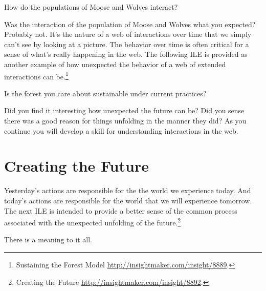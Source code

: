 \documentclass[]{memoir}
\begin{document}
\FloatBarrier 

\begin{model}[frametitle={Model: Moose and Wolves}] 

 How do the populations of Moose and Wolves interact?




 \end{model}

Was the interaction of the population of Moose and Wolves what you
expected? Probably not. It's the nature of a web of interactions over
time that we simply can't see by looking at a picture. The behavior over
time is often critical for a sense of what's really happening in the
web. The following ILE is provided as another example of how unexpected
the behavior of a web of extended interactions can be.\footnote{Sustaining
  the Forest Model \url{http://insightmaker.com/insight/8889}.}

\FloatBarrier 

\begin{model}[frametitle={Model: Sustaining the Forest}] 

 Is the forest you care about sustainable under current practices?




 \end{model}

Did you find it interesting how unexpected the future can be? Did you
sense there was a good reason for things unfolding in the manner they
did? As you continue you will develop a skill for understanding
interactions in the web.

\section{Creating the Future}

Yesterday's actions are responsible for the the world we experience
today. And today's actions are responsible for the world that we will
experience tomorrow. The next ILE is intended to provide a better sense
of the common process associated with the unexpected unfolding of the
future.\footnote{Creating the Future
  \url{http://insightmaker.com/insight/8892}.}

\FloatBarrier 

\begin{model}[frametitle={Model: Creating the Future}] 

 There is a meaning to it all.




 \end{model}
\end{document}
